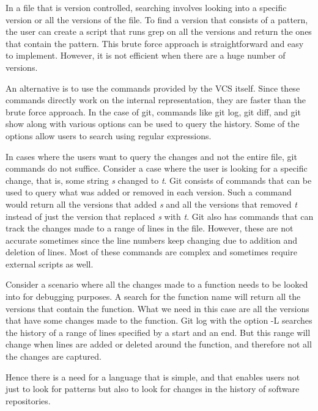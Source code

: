 In a file that is version controlled, searching involves looking into a specific version or all the versions of the file. To find a version that consists of a pattern, the user can create a script that runs grep on all the versions and return the ones that contain the pattern. This brute force approach is straightforward and easy to implement. However, it is not efficient when there are a huge number of versions.

An alternative is to use the commands provided by the VCS itself. Since these commands directly work on the internal representation, they are faster than the brute force approach. In the case of git, commands like {\ttf git log}, {\ttf git diff}, and {\ttf git show} along with various options can be used to query the history. Some of the options allow users to search using regular expressions.

In cases where the users want to query the changes and not the entire file, git commands do not suffice. Consider a case where the user is looking for a specific change, that is, some string \textit{s} changed to \textit{t}.
Git consists of commands that can be used to query what was added or removed in each version. 
Such a command would return all the versions that added \textit{s} and all the versions that removed \textit{t} instead of just the version that replaced \textit{s} with \textit{t}.  Git also has commands that can track the changes made to a range of lines in the file. However, these are not accurate sometimes since the line numbers keep changing due to addition and deletion of lines.
Most of these commands are complex and sometimes require external scripts as well.

Consider a scenario where all the changes made to a function needs to be looked into for debugging purposes. A search for the function name will return all the versions that contain the function.  What we need in this case are all the versions that have some changes made to the function. Git log with the option -L searches the history of a range of lines specified by a start and an end. But this range will change when lines are added or deleted around the function, and therefore not all the changes are captured.

Hence there is a need for a language that is simple, and that enables users not just to look for patterns but also to look for changes in the history of software repositories.


